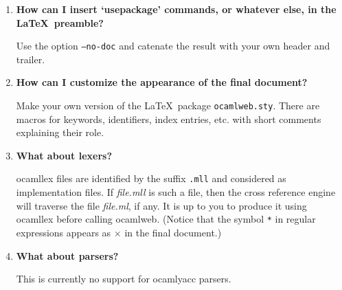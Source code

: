 \documentclass[12pt]{article}
\newcommand{\ocamlweb}{\textsf{ocamlweb}}
\begin{document}
\begin{enumerate}
\item \textbf{How can I insert `usepackage' commands, or whatever else,
  in the \LaTeX\ preamble?} ~\par

  Use the option \texttt{--no-doc} and catenate the result with your
  own header and trailer.

\item \textbf{How can I customize the appearance of the final
    document?} ~\par 

  Make your own version of the \LaTeX\ package
  \texttt{ocamlweb.sty}. There are macros for keywords, identifiers,
  index entries, etc. with short comments explaining their role.

\item \textbf{What about lexers?} ~\par

  \textsf{ocamllex} files are identified by the suffix \verb!.mll! and
  considered as implementation files. If \textit{file.mll} is such a
  file, then the cross reference engine will traverse the file
  \textit{file.ml}, if any. It is up to you to produce it using
  \textsf{ocamllex} before calling \ocamlweb. (Notice that the symbol
  \verb!*! in regular expressions appears as $\times$ in the final
  document.)

\item \textbf{What about parsers?} ~\par

  This is currently no support for \textsf{ocamlyacc} parsers.

\end{enumerate}



\end{document}
